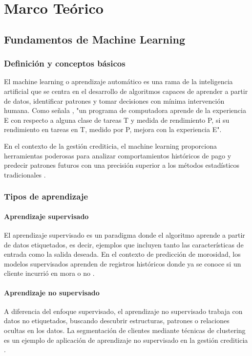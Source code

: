 \chapter{Marco Teórico}

\section{Fundamentos de Machine Learning}
\subsection{Definición y conceptos básicos}
El machine learning o aprendizaje automático es una rama de la inteligencia artificial que se centra en el desarrollo de algoritmos capaces de aprender a partir de datos, identificar patrones y tomar decisiones con mínima intervención humana. Como señala \cite{mitchell1997machine}, "un programa de computadora aprende de la experiencia E con respecto a alguna clase de tareas T y medida de rendimiento P, si su rendimiento en tareas en T, medido por P, mejora con la experiencia E".

En el contexto de la gestión crediticia, el machine learning proporciona herramientas poderosas para analizar comportamientos históricos de pago y predecir patrones futuros con una precisión superior a los métodos estadísticos tradicionales \citep{kim2022credit, lessmann2015benchmarking}.

\subsection{Tipos de aprendizaje}
\subsubsection{Aprendizaje supervisado}
El aprendizaje supervisado es un paradigma donde el algoritmo aprende a partir de datos etiquetados, es decir, ejemplos que incluyen tanto las características de entrada como la salida deseada. En el contexto de predicción de morosidad, los modelos supervisados aprenden de registros históricos donde ya se conoce si un cliente incurrió en mora o no \citep{baesens2003benchmarking}.

\subsubsection{Aprendizaje no supervisado}
A diferencia del enfoque supervisado, el aprendizaje no supervisado trabaja con datos no etiquetados, buscando descubrir estructuras, patrones o relaciones ocultas en los datos. La segmentación de clientes mediante técnicas de clustering es un ejemplo de aplicación de aprendizaje no supervisado en la gestión crediticia \citep{huang2007credit}.

